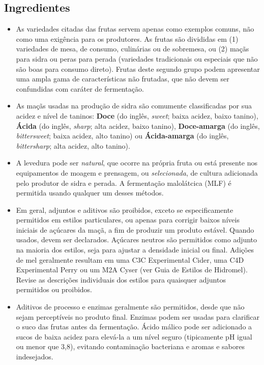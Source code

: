 \subsection*{Ingredientes}

\begin{itemize}
\item As variedades citadas das frutas servem apenas como exemplos comuns, não como uma exigência para os produtores. As frutas são divididas em (1) variedades de mesa, de consumo, culinárias ou de sobremesa, ou (2) maçãs para sidra ou peras para perada (variedades tradicionais ou especiais que não são boas para consumo direto). Frutas deste segundo grupo podem apresentar uma ampla gama de características não frutadas, que não devem ser confundidas com caráter de fermentação.
\item As maçãs usadas na produção de sidra são comumente classificadas por sua acidez e nível de taninos: \textbf{Doce} (do inglês, \textit{sweet}; baixa acidez, baixo tanino), \textbf{Ácida} (do inglês, \textit{sharp}; alta acidez, baixo tanino), \textbf{Doce-amarga} (do inglês, \textit{bittersweet}; baixa acidez, alto tanino) ou \textbf{Ácida-amarga} (do inglês, \textit{bittersharp}; alta acidez, alto tanino).
\item A levedura pode ser \textit{natural}, que ocorre na própria fruta ou está presente nos equipamentos de moagem e prensagem, ou \textit{selecionada}, de cultura adicionada pelo produtor de sidra e perada. A fermentação malolátcica (MLF) é permitida usando qualquer um desses métodos.
\item Em geral, adjuntos e aditivos são proibidos, exceto se especificamente permitidos em estilos particulares, ou apenas para corrigir baixos níveis iniciais de açúcares da maçã, a fim de produzir um produto estável. Quando usados, devem ser declarados. Açúcares neutros são permitidos como adjunto na maioria dos estilos, seja para ajustar a densidade inicial ou final. Adições de mel geralmente resultam em uma C3C Experimental Cider, uma C4D Experimental Perry ou um M2A Cyser (ver Guia de Estilos de Hidromel). Revise as descrições individuais dos estilos para quaisquer adjuntos permitidos ou proibidos.
\item Aditivos de processo e enzimas geralmente são permitidos, desde que não sejam perceptíveis no produto final. Enzimas podem ser usadas para clarificar o suco das frutas antes da fermentação. Ácido málico pode ser adicionado a sucos de baixa acidez para elevá-la a um nível seguro (tipicamente pH igual ou menor que 3,8), evitando contaminação bacteriana e aromas e sabores indesejados.

\end{itemize}
